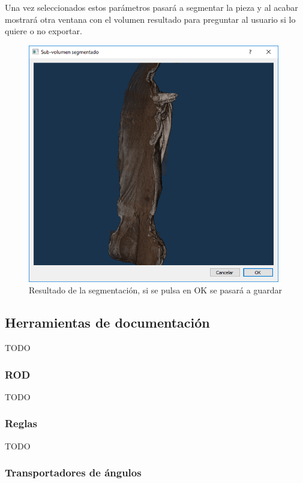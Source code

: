 Una vez seleccionados estos parámetros pasará a segmentar la pieza y al acabar mostrará otra ventana con el volumen resultado para preguntar al usuario si lo quiere o no exportar.

\begin{figure}[H]
	\centering
	\includegraphics[width=11cm]{imagenes/desarrollo/gui-segmentacion-resultado}
	\caption{Resultado de la segmentación, si se pulsa en OK se pasará a guardar}
	\label{fig:desarrollo/gui-segmentacion-resultado}
\end{figure}

\subsection{Herramientas de documentación}

TODO

\subsubsection{ROD}

TODO

\subsubsection{Reglas}

TODO

\subsubsection{Transportadores de ángulos}

